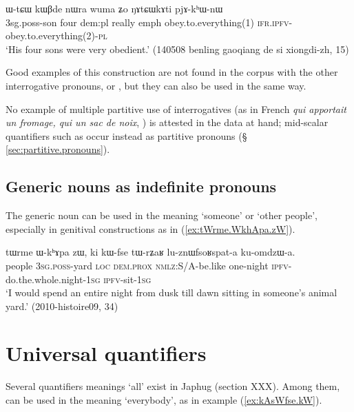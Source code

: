  \begin{exe}
\ex \label{ex:NAtCWkAti}
\gll  ɯ-tɕɯ kɯβde nɯra wuma ʑo ŋɤtɕɯkɤti pjɤ-kʰɯ-nɯ  \\
3sg.poss-son four dem:pl really emph obey.to.everything(1) \textsc{ifr.ipfv}-obey.to.everything(2)-\textsc{pl} \\
\glt `His four sons were very obedient.' (140508 benling gaoqiang de si xiongdi-zh, 15)
\end{exe} 

Good examples of this construction are not found in the corpus with the other interrogative pronouns,  or , but they can also be used in the same way.

No example of multiple partitive use of interrogatives (as in French \textit{qui apportait un fromage, qui un sac de noix}, \citealt[177]{haspelmath97indef} ) is attested in the data at hand; mid-scalar quantifiers such as  occur instead as partitive pronouns (§ \ref{sec:partitive.pronouns}). 

\subsection{Generic nouns as indefinite pronouns}
The generic noun  can be used in the meaning `someone' or `other people', especially in genitival constructions as in (\ref{ex:tWrme.WkhApa.zW}).
 
\begin{exe}
\ex \label{ex:tWrme.WkhApa.zW}
\gll tɯrme ɯ-kʰɤpa zɯ, ki kɯ-fse tɯ-rʑaʁ lu-znɯfsoʁspat-a ku-omdzɯ-a. \\
people \textsc{3sg}.\textsc{poss}-yard \textsc{loc} \textsc{dem}.\textsc{prox} \textsc{nmlz}:S/A-be.like one-night \textsc{ipfv}-do.the.whole.night-\textsc{1sg} \textsc{ipfv}-sit-\textsc{1sg} \\
\glt `I would spend an entire night from dusk till dawn sitting in someone's animal yard.' (2010-histoire09, 34)
\end{exe} 

\section{Universal quantifiers} \label{sec:quantifiers} \label{sec:aRandWndAt}
Several quantifiers meanings `all' exist in Japhug (section XXX). Among them,  can be used in the meaning `everybody', as in example (\ref{ex:kAsWfse.kW}).

